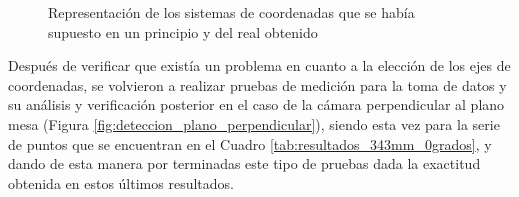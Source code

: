   \begin{figure}[H]
      \begin{center}
        \subcapcentertrue
        \hspace{1mm}
      \end{center}
      \caption{Representación de los sistemas de coordenadas que se había supuesto en un principio y del real obtenido}
      \label{fig:sistemas_coordenadas}
    \end{figure}

Después de verificar que existía un problema en cuanto a la elección de los ejes de coordenadas, se volvieron a realizar pruebas de medición para la toma de datos y su análisis y verificación posterior en el caso de la cámara perpendicular al plano mesa (Figura \ref{fig:deteccion_plano_perpendicular}), siendo esta vez para la serie de puntos que se encuentran en el Cuadro \ref{tab:resultados_343mm_0grados}, y dando de esta manera por terminadas este tipo de pruebas dada la exactitud obtenida en estos últimos resultados.


